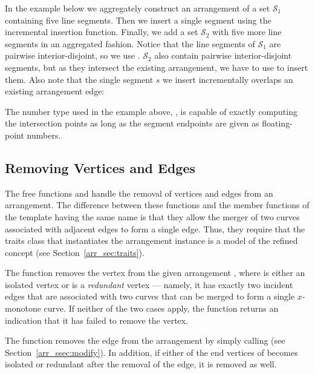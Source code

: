 In the example below we aggregately construct an arrangement of a set
${\mathcal S}_1$ containing five line segments. Then we insert a single
segment using the incremental insertion function. Finally, we add a set
${\mathcal S}_2$ with five more line segments in an aggregated fashion.
Notice that the line segments of ${\mathcal S}_1$ are pairwise
interior-disjoint, so we use .
${\mathcal S}_2$ also contain pairwise interior-disjoint segments,
but as they intersect the existing arrangement, we have to use
 to insert them. Also note that the
single segment $s$ we insert incrementally overlaps an existing
arrangement edge:


The number type used in the example above,
, is capable of exactly computing the
intersection points as long as the segment endpoints are given as
floating-point numbers.

\subsection{Removing Vertices and Edges}
\label{arr_ssec:gl_remove}
%
The free functions  and  handle
the removal of vertices and edges from an arrangement. The difference
between these functions and the member functions of the 
template having the same name is that they allow the merger of two curves
associated with adjacent edges to form a single edge. Thus, they require
that the traits class that instantiates the arrangement instance is a model
of the refined  concept (see
Section~\ref{arr_sec:traits}).

The function  removes the vertex
 from the given arrangement , where  is
either an isolated vertex or is a {\em redundant} vertex ---
namely, it has exactly two incident edges that are associated with
two curves that can be merged to form a single $x$-monotone curve.
If neither of the two cases apply, the function returns an
indication that it has failed to remove the vertex.

The function  removes the edge 
from the arrangement by simply calling 
(see Section~\ref{arr_ssec:modify}). In addition, if either of the
end vertices of  becomes isolated or redundant after the removal
of the edge, it is removed as well.

